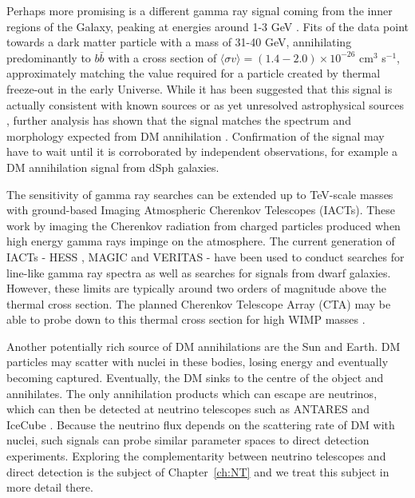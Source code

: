 Perhaps more promising is a different gamma ray signal coming from the inner regions of the Galaxy, peaking at energies around 1-3 GeV \cite{Goodenough:2009,Hooper:2011}. Fits of the data point towards a dark matter particle with a mass of 31-40 GeV, annihilating predominantly to $b\bar{b}$ with a cross section of $\langle \sigma v \rangle = (1.4-2.0) \times 10^{-26}$ cm$^3$ s$^{-1}$, approximately matching the value required for a particle created by thermal freeze-out in the early Universe. While it has been suggested that this signal is actually consistent with known sources \cite{Boyarsky:2010} or as yet unresolved astrophysical sources \cite{Abazajian:2011}, further analysis has shown that the signal matches the spectrum and morphology expected from DM annihilation \cite{Daylan:2014}. Confirmation of the signal may have to wait until it is corroborated by independent observations, for example a DM annihilation signal from dSph galaxies.

The sensitivity of gamma ray searches can be extended up to TeV-scale masses with ground-based Imaging Atmospheric Cherenkov Telescopes (IACTs). These work by imaging the Cherenkov radiation from charged particles produced when high energy gamma rays impinge on the atmosphere. The current generation of IACTs - HESS \cite{Abramowski:2013}, MAGIC \cite{Aleksic:2014} and VERITAS \cite{Acciari:2010} - have been used to conduct searches for line-like gamma ray spectra as well as searches for signals from dwarf galaxies. However, these limits are typically around two orders of magnitude above the thermal cross section. The planned Cherenkov Telescope Array (CTA) may be able to probe down to this thermal cross section for high WIMP masses \cite{Doro:2013}.


Another potentially rich source of DM annihilations are the Sun and Earth. DM particles may scatter with nuclei in these bodies, losing energy and eventually becoming captured. Eventually, the DM sinks to the centre of the object and annihilates. The only annihilation products which can escape are neutrinos, which can then be detected at neutrino telescopes such as ANTARES \cite{Zornoza:2012} and IceCube \cite{Aartsen:2013b}. Because the neutrino flux depends on the scattering rate of DM with nuclei, such signals can probe similar parameter spaces to direct detection experiments. Exploring the complementarity between neutrino telescopes and direct detection is the subject of Chapter~\ref{ch:NT} and we treat this subject in more detail there.





